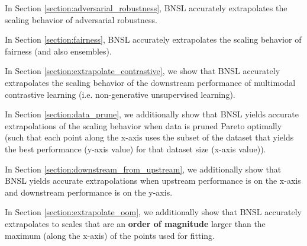 \documentclass{article} %
\begin{document}
In Section \ref{section:adversarial_robustness}, BNSL accurately extrapolates the scaling behavior of adversarial robustness.

\vspace{-2.2mm}

In Section \ref{section:fairness}, BNSL accurately extrapolates the scaling behavior of fairness (and also ensembles).

\vspace{-2.2mm}

In Section \ref{section:extrapolate_contrastive}, we show that BNSL accurately extrapolates the scaling behavior of the downstream performance of multimodal contrastive learning (i.e. non-generative unsupervised learning).

\vspace{-2.2mm}

In Section \ref{section:data_prune}, we additionally show that BNSL yields accurate extrapolations of the scaling behavior when data is pruned Pareto optimally (such that each point along the x-axis uses the subset of the dataset that yields the best performance (y-axis value) for that dataset size (x-axis value)).

\vspace{-2.2mm}

In Section \ref{section:downstream_from_upstream}, we additionally show that BNSL yields accurate extrapolations when upstream performance is on the x-axis and downstream performance is on the y-axis.

\vspace{-2.2mm}

In Section \ref{section:extrapolate_oom}, we additionally show that BNSL accurately extrapolates to scales that are an \textbf{order of magnitude} larger than the maximum (along the x-axis) of the points used for fitting.


\iffalse
\end{document}
